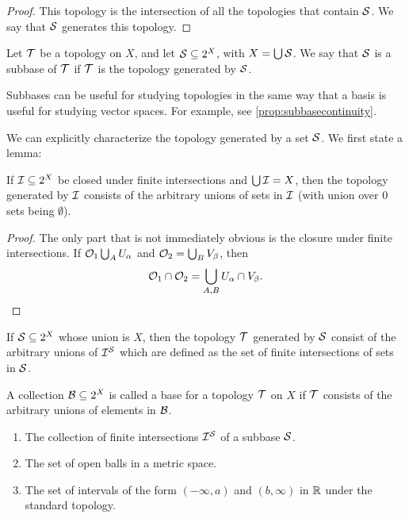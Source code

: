 \begin{proof}
    This topology is the intersection of all the topologies that contain $\mathcal S$. We say that $\mathcal S$ generates this topology.
\end{proof}

\begin{definition}[Subbase]
    Let $\mathcal T$ be a topology on $X$, and let $\mathcal S \subseteq 2^X$, with $X = \bigcup \mathcal S$. We say that $\mathcal S$ is a subbase of $\mathcal T$ if $\mathcal T$ is the topology generated by $\mathcal S$.
\end{definition}

Subbases can be useful for studying topologies in the same way that a basis is useful for studying vector spaces. For example, see \autoref{prop:subbasecontinuity}.

We can explicitly characterize the topology generated by a set $\mathcal S$. We first state a lemma:

\begin{lemma}
    If $\mathcal I \subseteq 2^X$ be closed under finite intersections and $\bigcup \mathcal I = X$, then the topology generated by $\mathcal I$ consists of the arbitrary unions of sets in $\mathcal I$ (with union over $0$ sets being $\emptyset$).
\end{lemma}

\begin{proof}
    The only part that is not immediately obvious is the closure under finite intersections. If $\mathcal O_1 \bigcup_A U_\alpha$ and $\mathcal O_2 = \bigcup_B V_\beta$, then \[ \mathcal O_1 \cap \mathcal O_2 = \bigcup_{A, B} U_\alpha \cap V_\beta.\]
\end{proof}

\begin{proposition}
    If $\mathcal S \subseteq 2^X$ whose union is $X$, then the topology $\mathcal T$ generated by $\mathcal S$ consist of the arbitrary unions of $\mathcal I^{\mathcal S}$ which are defined as the set of finite intersections of sets in $\mathcal S$.
\end{proposition}

\begin{definition}[Base]
    A collection $\mathcal B \subseteq 2^X$ is called a base for a topology $\mathcal T$ on $X$ if $\mathcal T$ consists of the arbitrary unions of elements in $\mathcal B$.
\end{definition}

\begin{example}
    \begin{enumerate}
        \item The collection of finite intersections $\mathcal I^{\mathcal S}$ of a subbase $\mathcal S$.
        \item The set of open balls in a metric space.
        \item The set of intervals of the form $(-\infty, a)$ and $(b, \infty)$ in $\mathbb R$ under the standard topology.
    \end{enumerate}
\end{example}

